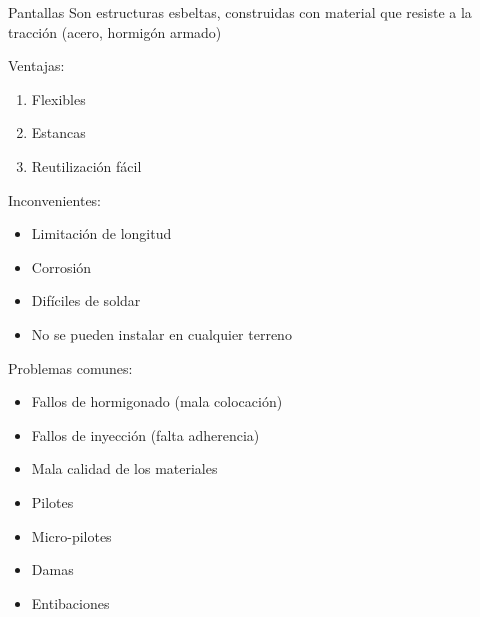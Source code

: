 \begin{mybox}{Pantallas}
	Son estructuras esbeltas, construidas con material que resiste a la tracción (acero, hormigón armado)

	\begin{minipage}[t]{0.5\textwidth}
	Ventajas:
	\begin{enumerate}
		\item Flexibles
		\item Estancas
		\item Reutilización fácil
	\end{enumerate}
	\end{minipage}%
	\begin{minipage}[t]{0.5\textwidth}
	Inconvenientes:
		\begin{itemize}
			\item Limitación de longitud
			\item Corrosión
			\item Difíciles de soldar
			\item No se pueden instalar en cualquier terreno
		\end{itemize}
	\end{minipage}

	Problemas comunes:
	\begin{itemize}
		\item Fallos de hormigonado (mala colocación)
		\item Fallos de inyección (falta adherencia)
		\item Mala calidad de los materiales
	\end{itemize}

	\begin{itemize}
		\item Pilotes
		\item Micro-pilotes
		\item Damas
		\item Entibaciones
	\end{itemize}




\end{mybox}
